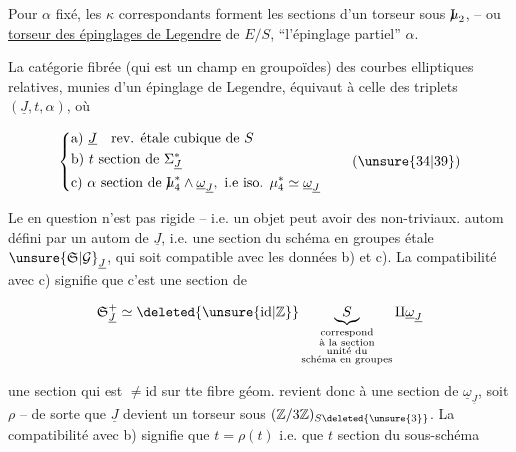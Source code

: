 Pour $\alpha$ fixé, les $\kappa$ correspondants forment les sections d'un torseur sous $\mathord{\mathrm{I}\mkern-7mu\mu}_2$, -- ou \uline{torseur des épinglages de Legendre} de $E/S$,   ``l'épinglage partiel'' $\alpha$.

La catégorie  fibrée (qui est un champ en groupoïdes) des courbes elliptiques relatives, munies d'un épinglage de Legendre, équivaut à celle des triplets $(\underline J,t,\alpha)$, où

\[
\left\{\begin{aligned}
&\text{a) }\underline J\quad\text{rev. étale cubique de }S\\
&\text{b) }t\ \text{section de }\Sigma_{\underline J}^*\\
&\text{c) }\alpha\ \text{section de }\mathord{\mathrm{I}\mkern-7mu\mu}_4^*\wedge\underline\omega_{\underline J},\ \text{i.e iso. }\mu_4^*\simeq\underline\omega_{\underline J}
\end{aligned}\right.
\tag*{(\unsure{34|39})}
\]



Le   en question n'est pas rigide -- i.e. un objet peut avoir des  non-triviaux.   autom   défini par un autom de $\underline J$, i.e. une section du schéma en groupes étale $\unsure{\mathfrak S|\mathcal G}_{\underline J}$, qui soit compatible avec les données b) et c). La compatibilité avec c) signifie que c'est une section de

\[
\mathfrak S_{\underline J}^{+}\simeq\deleted{\unsure{\mathrm{id}|\mathbb Z}}
\underbrace{S}_{\substack{\text{correspond}\\\text{à la section}\\\text{unité du}\\\text{schéma en groupes}}}
\amalg\underline\omega_{\underline J}
\]

une section qui est $\ne\mathrm{id}$ sur tte fibre géom. revient donc à une section de $\underline\omega_{\underline J}$, soit $\rho$ -- de sorte que $\underline J$ devient un torseur sous $(\mathbb Z/3\mathbb Z)_{S\deleted{\unsure{3}}}$. La compatibilité avec b) signifie que $t=\rho(t)$ i.e. que $t$   section du sous-schéma

